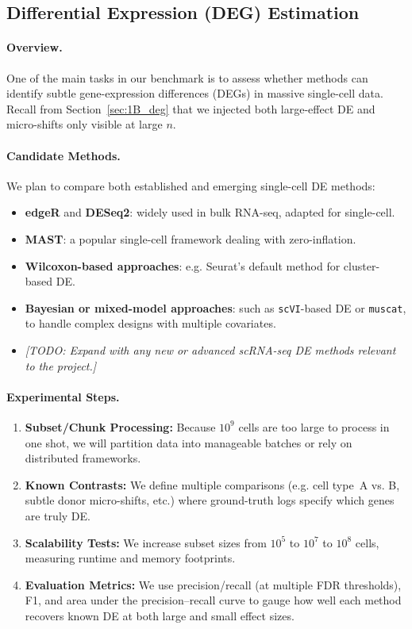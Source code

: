 \documentclass{article}
\begin{document}
\subsection{Differential Expression (DEG) Estimation}
\label{subsec:deg_estimation}

\paragraph{Overview.}
One of the main tasks in our benchmark is to assess whether methods can identify subtle gene-expression differences (DEGs) in massive single-cell data. Recall from Section~\ref{sec:1B_deg} that we injected both large-effect DE and micro-shifts only visible at large $n$.

\paragraph{Candidate Methods.}
We plan to compare both established and emerging single-cell DE methods:
\begin{itemize}
	\item \textbf{edgeR} and \textbf{DESeq2}: widely used in bulk RNA-seq, adapted for single-cell.
	\item \textbf{MAST}: a popular single-cell framework dealing with zero-inflation.
	\item \textbf{Wilcoxon-based approaches}: e.g. Seurat’s default method for cluster-based DE.
	\item \textbf{Bayesian or mixed-model approaches}: such as \texttt{scVI}-based DE or \texttt{muscat}, to handle complex designs with multiple covariates.
	\item \textit{[TODO: Expand with any new or advanced scRNA-seq DE methods relevant to the project.]}
\end{itemize}

\paragraph{Experimental Steps.}
\begin{enumerate}
	\item \textbf{Subset/Chunk Processing:} Because $10^9$ cells are too large to process in one shot, we will partition data into manageable batches or rely on distributed frameworks. 
	\item \textbf{Known Contrasts:} We define multiple comparisons (e.g. cell type~A vs. B, subtle donor micro-shifts, etc.) where ground-truth logs specify which genes are truly DE.
	\item \textbf{Scalability Tests:} We increase subset sizes from $10^5$ to $10^7$ to $10^8$ cells, measuring runtime and memory footprints.  
	\item \textbf{Evaluation Metrics:} We use precision/recall (at multiple FDR thresholds), F1, and area under the precision–recall curve to gauge how well each method recovers known DE at both large and small effect sizes.
\end{enumerate}
\end{document}
